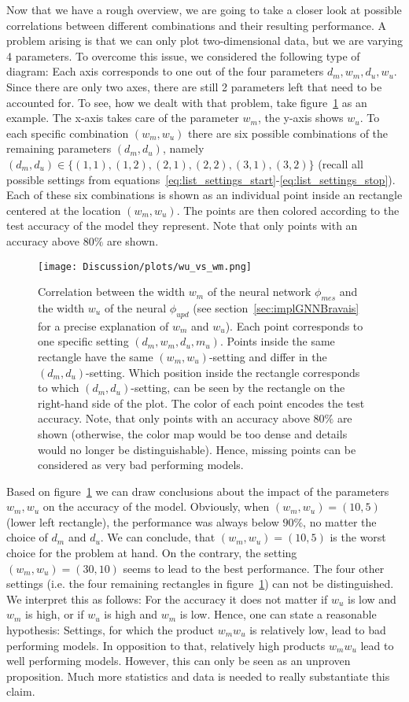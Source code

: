 Now that we have a rough overview, we are going to take a closer look at possible 
correlations between different combinations and their resulting performance.
A problem arising is that we can only plot two-dimensional data, but we are varying 4 parameters.
To overcome this issue, we considered the following type of diagram: 
Each axis corresponds to one out of the four parameters $d_m,w_m,d_u,w_u$. 
Since there are only two axes, there are still 2 parameters left that need to be accounted for. 
To see, how we dealt with that problem, take figure~\ref{fig:wu_vs_wm} as an example. 
The x-axis takes care of the parameter $w_m$, the y-axis shows $w_u$. 
To each specific combination $(w_m,w_u)$ there are six possible combinations of the remaining parameters $(d_m,d_u)$, 
namely $(d_m,d_u)\in\{(1,1),(1,2),(2,1),(2,2),(3,1),(3,2)\}$ 
(recall all possible settings from equations~\ref{eq:list_settings_start}-\ref{eq:list_settings_stop}).
Each of these six combinations is shown as an individual point inside an rectangle centered at the location $(w_m,w_u)$.
The points are then colored according to the test accuracy of the model they represent. 
Note that only points with an accuracy above $80\%$ are shown.
\begin{figure}[h]
    \centering
    \texttt{[image: Discussion/plots/wu\_vs\_wm.png]}
    \caption{Correlation between the width $w_m$ of the neural network $\phi_{mes}$ and the width $w_u$ of the neural $\phi_{upd}$
    (see section~\ref{sec:implGNNBravais} for a precise explanation of $w_m$ and $w_u$).
    Each point corresponds to one specific setting $(d_m,w_m,d_u,m_u)$. Points inside the same rectangle have the same $(w_m,w_u)$-setting
    and differ in the $(d_m,d_u)$-setting. Which position inside the rectangle corresponds to which $(d_m,d_u)$-setting, can be seen by 
    the rectangle on the right-hand side of the plot. The color of each point encodes the test accuracy. Note, that only points with
    an accuracy above $80\%$ are shown (otherwise, the color map would be too dense and details would no longer be distinguishable). 
    Hence, missing points can be considered as very bad performing models.}
    \label{fig:wu_vs_wm}
\end{figure}
Based on figure~\ref{fig:wu_vs_wm} we can draw conclusions about the impact of the parameters $w_m,w_u$ on the accuracy of the model.
Obviously, when $(w_m,w_u)=(10,5)$ (lower left rectangle), the performance was always below 
$90\%$, no matter the choice of $d_m$ and $d_u$. 
We can conclude, that $(w_m,w_u)=(10,5)$ is the worst choice for the problem at hand.
On the contrary, the setting $(w_m,w_u)=(30,10)$ seems to lead to the best performance.
The four other settings (i.e. the four remaining rectangles in figure~\ref{fig:wu_vs_wm}) can not be distinguished.
We interpret this as follows: For the accuracy it does not matter if $w_u$ is low and $w_m$ is high, or if $w_u$ is high and $w_m$ is low.
Hence, one can state a reasonable hypothesis: Settings, for which the product $w_mw_u$ is relatively low, lead
to bad performing models. In opposition to that, relatively high products $w_mw_u$ lead to well performing models.
However, this can only be seen as an unproven proposition. 
Much more statistics and data is needed to really substantiate this claim.


